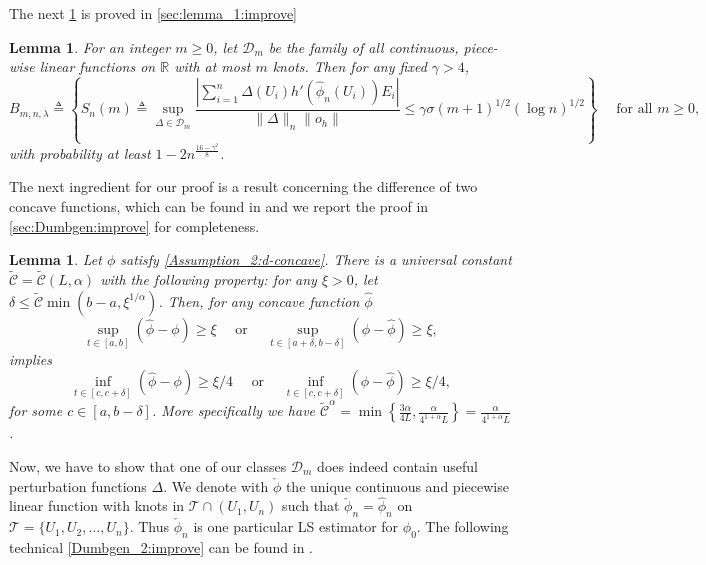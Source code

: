 \documentclass{article} %
\newtheorem{lemma}[theorem]{Lemma}
\begin{document}
The next \cref{lemma_1:improve} is proved in \cref{sec:lemma_1:improve}

\begin{lemma}\label{lemma_1:improve}
For an integer $m \geq 0$, let $\mathcal{D}_m$ be the family of all continuous, piece-wise linear functions on $\mathbb{R}$ with at most $m$ knots. Then for any fixed $\gamma>4$,
$$
B_{m,n,\lambda}\triangleq \left\{S_n(m)\triangleq \sup _{\Delta \in \mathcal{D}_m} \frac{\left|\sum_{i=1}^n \Delta\left(U_i\right)h'(\widehat{\phi}_n\left(U_i\right)) E_i\right|}{\|\Delta\|_n \|o_h\|} \leq \gamma \sigma (m+1)^{1 / 2}(\log n)^{1 / 2}\right\} \quad \text { for all } m \geq 0,
$$
with probability at least $1-2n^{\frac{16-\gamma^2}{8}}$.
\end{lemma}

The next ingredient for our proof is a result concerning the difference of two concave functions, which can be found in \citet[Lemma 5.2]{dumbgen2004consistency} and we report the proof in \cref{sec:Dumbgen:improve} for completeness.

\begin{lemma}\label{Dumbgen:improve}
Let $\phi$ satisfy \cref{Assumption_2:d-concave}. There is a universal constant $\widetilde{\mathscr{C}}=\widetilde{\mathscr{C}}(L,\alpha)$ with the following property: for any $\xi>0$, let $\delta \leq \widetilde{\mathscr{C}} \min \left(b-a, \xi^{1/\alpha}\right)$. Then, for any concave function $\hat \phi$
$$
\sup _{t \in[a, b]}(\widehat \phi- \phi ) \geq \xi \quad \text{ or } \quad
\sup _{t \in[a+\delta, b-\delta]}( \phi- \widehat \phi ) \geq \xi,
$$
implies
$$
\inf _{t \in[c, c+\delta]}(\widehat \phi- \phi ) \geq \xi / 4  \quad \text{ or } \quad 
\inf _{t \in[c, c+\delta]}( \phi- \widehat \phi ) \geq \xi / 4,
$$
for some $c \in[a, b-\delta]$. More specifically we have $\widetilde{\mathscr{C}}^{\alpha} = \min\left\{ \frac{3\alpha}{4L},\frac{\alpha}{4^{1+\alpha}L}\right\} = \frac{\alpha}{4^{1+\alpha}L}$.
\end{lemma}

Now, we have to show that one of our classes $\mathcal{D}_m$ does indeed contain useful perturbation functions $\Delta$. We denote with $\check{\phi}$ the unique continuous and piecewise linear function with knots in $\mathscr{T} \cap\left(U_1, U_n\right)$ such that $\check{\phi}_n=\widehat{\phi}_n$ on $\mathscr{T} = \{U_1,U_2,\dots, U_n\}$. Thus $\check{\phi}_n$ is one particular LS estimator for $\phi_0$. The following technical \cref{Dumbgen_2:improve} can be found in \citet[Lemma 3]{dumbgen2004consistency}.
\end{document}
